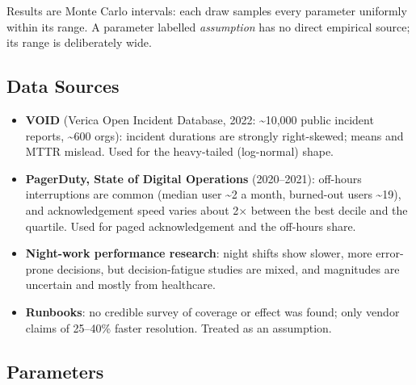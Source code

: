 \documentclass[letterpaper,twocolumn,10pt]{article}
\begin{document}
Results are Monte Carlo intervals: each draw samples every parameter uniformly within its range. A parameter labelled \emph{assumption} has no direct empirical source; its range is deliberately wide.

\subsection*{Data Sources}

\begin{itemize}
\item \textbf{VOID} (Verica Open Incident Database, 2022: \textasciitilde{}10,000 public incident reports, \textasciitilde{}600 orgs): incident durations are strongly right-skewed; means and MTTR mislead. Used for the heavy-tailed (log-normal) shape.
\item \textbf{PagerDuty, State of Digital Operations} (2020--2021): off-hours interruptions are common (median user \textasciitilde{}2 a month, burned-out users \textasciitilde{}19), and acknowledgement speed varies about 2$\times$ between the best decile and the quartile. Used for paged acknowledgement and the off-hours share.
\item \textbf{Night-work performance research}: night shifts show slower, more error-prone decisions, but decision-fatigue studies are mixed, and magnitudes are uncertain and mostly from healthcare.
\item \textbf{Runbooks}: no credible survey of coverage or effect was found; only vendor claims of 25--40\% faster resolution. Treated as an assumption.
\end{itemize}

\subsection*{Parameters}
\end{document}
